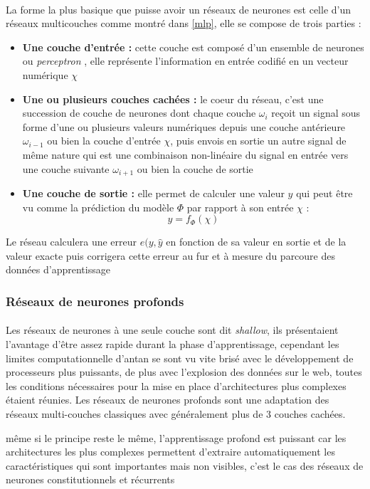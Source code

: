 		\paragraph{}
		La forme la plus basique que puisse avoir un réseaux de neurones est celle d'un réseaux multicouches comme montré dans \ref{mlp}, elle se compose de trois parties :
		\begin{itemize}
			\item \textbf{Une couche d'entrée : } cette couche est composé d'un ensemble de neurones ou \textit{perceptron} \cite{perceptron}, elle représente l'information en entrée codifié en un vecteur numérique $\chi$
			
			\item  \textbf{Une ou plusieurs couches cachées :} le coeur du réseau, c'est une succession de couche de neurones dont chaque couche $\omega_i$ reçoit un signal sous forme d'une ou plusieurs valeurs numériques depuis une couche antérieure $\omega_{i-1}$ ou bien la couche d'entrée $\chi$, puis envois en sortie  un autre signal de même nature qui est une combinaison non-linéaire du signal en entrée vers une couche suivante $\omega_{i+1}$ ou bien la couche de sortie
			\item \textbf{Une couche de sortie :}
			elle permet de calculer une valeur $y$ qui peut être vu comme la prédiction du modèle $\Phi$ par rapport à son entrée $\chi$ : 
			\begin{equation}
				y = f_\Phi(\chi)
			\end{equation}
		\end{itemize}
		Le réseau calculera une erreur $e(y,\hat{y}$ en fonction de sa valeur en sortie et de la valeur exacte puis corrigera cette erreur au fur et à mesure du parcoure des données d'apprentissage \cite{mlp}
		
		\subsubsection{Réseaux de neurones profonds}\label{part2DNN}
		\paragraph{}
		Les réseaux de neurones à une seule couche sont dit \textit{shallow}, ils présentaient l'avantage d'être assez rapide durant la phase d'apprentissage, cependant les limites computationnelle d'antan se sont vu vite brisé avec le développement de processeurs plus puissants, de plus avec l'explosion des données sur le web, toutes les conditions nécessaires pour la mise en place d'architectures plus complexes étaient réunies. Les réseaux de neurones profonds sont une adaptation des réseaux multi-couches classiques avec généralement plus de 3 couches cachées. \par même si le principe reste le même, l'apprentissage profond est puissant car les architectures les plus complexes permettent d'extraire automatiquement les caractéristiques qui sont importantes mais non visibles, c'est le cas des réseaux de neurones constitutionnels et récurrents \cite{dnn} 
		

